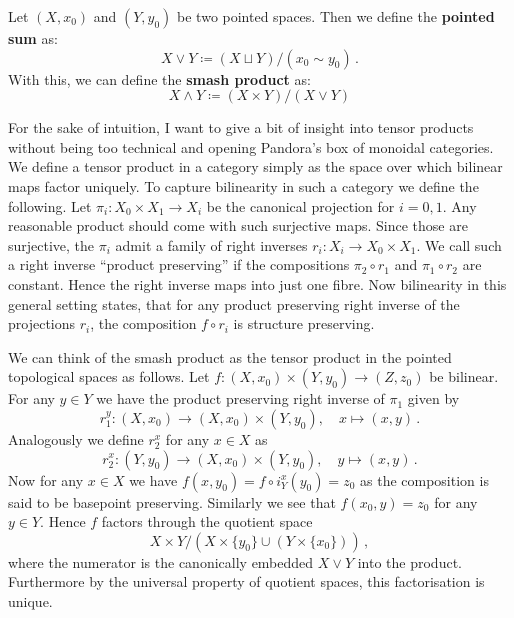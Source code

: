 \begin{definition}
	Let $(X,x_0)$ and $(Y,y_0)$ be two pointed spaces. Then we define the \textbf{pointed sum} as: 
	\begin{equation*}
		X \vee Y \coloneq (X\sqcup Y) \big/ (x_0\sim y_0) \,.
	\end{equation*} With this, we can define the \textbf{smash product} as:
	\begin{equation*}
		X\wedge Y \coloneq (X\times Y)\big/ (X\vee Y)
	\end{equation*}
\end{definition}
\begin{definition}
	For the sake of intuition, I want to give a bit of insight into tensor products without being too technical and opening Pandora's box of monoidal categories. We define a tensor product in a category simply as the space over which bilinear maps factor uniquely. To capture bilinearity in such a category we define the following. Let $\pi_i:X_0\times X_1 \to X_i$ be the canonical projection for $i=0,1$.  Any reasonable product should come with such surjective maps. Since those are surjective, the $\pi_i$ admit a family of right inverses $r_i: X_i\to X_0\times X_1$. We call such a right inverse \enquote{product preserving} if the compositions $\pi_{2}\circ r_1$ and $\pi_1\circ r_2$ are constant. Hence the right inverse maps into just one fibre. Now bilinearity in this general setting states, that for any product preserving right inverse of the projections $r_i$, the composition $f\circ r_i$ is structure preserving.
\end{definition}
\begin{remark}
	We can think of the smash product as the tensor product in the pointed topological spaces as follows. Let $f:(X,x_0)\times (Y,y_0)\to (Z,z_0)$ be bilinear. For any $y\in Y$ we have the product preserving right inverse of $\pi_1$ given by
	\begin{equation*}
		r_1^y: (X,x_0)\to (X,x_0)\times (Y,y_0),\quad x \mapsto (x,y)\,.
	\end{equation*} Analogously we define $r_2^x$ for any $x\in X$ as
	\begin{equation*}
		r_2^x: (Y,y_0)\to (X,x_0)\times (Y,y_0),\quad y \mapsto (x,y)\,.
	\end{equation*}
	 Now for any $x\in X$ we have $f(x,y_0)=f\circ i^x_Y(y_0)=z_0$ as the composition is said to be basepoint preserving. Similarly we see that $f(x_0,y)=z_0$ for any $y\in Y$. Hence $f$ factors through the quotient space \begin{equation*}
		X\times Y \big/ (X\times \{y_0\} \cup (Y\times \{x_0\})) \,,
	 \end{equation*} where the numerator is the canonically embedded $X\vee Y$ into the product. Furthermore by the universal property of quotient spaces, this factorisation is unique.
\end{remark}
